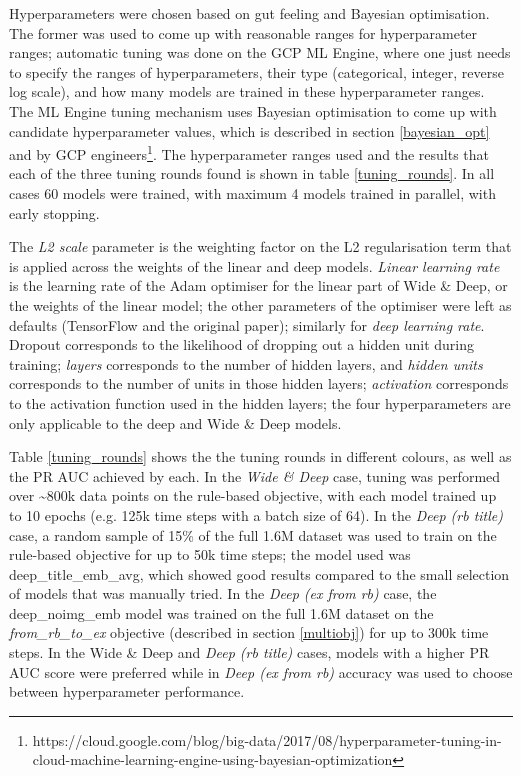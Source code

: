 Hyperparameters were chosen based on gut feeling and Bayesian optimisation.
The former was used to come up with reasonable ranges for hyperparameter ranges; automatic tuning was done on the GCP ML Engine, where one just needs to specify the ranges of hyperparameters, their type (categorical, integer, reverse log scale), and how many models are trained in these hyperparameter ranges.
The ML Engine tuning mechanism uses Bayesian optimisation to come up with candidate hyperparameter values, which is described in section \ref{bayesian_opt} and by GCP engineers\footnote{https://cloud.google.com/blog/big-data/2017/08/hyperparameter-tuning-in-cloud-machine-learning-engine-using-bayesian-optimization}.
The hyperparameter ranges used and the results that each of the three tuning rounds found is shown in table \ref{tuning_rounds}.
In all cases 60 models were trained, with maximum 4 models trained in parallel, with early stopping.

The \textit{L2 scale} parameter is the weighting factor on the L2 regularisation term that is applied across the weights of the linear and deep models.
\textit{Linear learning rate} is the learning rate of the Adam optimiser for the linear part of Wide \& Deep, or the weights of the linear model; the other parameters of the optimiser were left as defaults (TensorFlow and the original paper); similarly for \textit{deep learning rate}.
Dropout corresponds to the likelihood of dropping out a hidden unit during training; \textit{layers} corresponds to the number of hidden layers, and \textit{hidden units} corresponds to the number of units in those hidden layers; \textit{activation} corresponds to the activation function used in the hidden layers; the four hyperparameters are only applicable to the deep and Wide \& Deep models.

Table \ref{tuning_rounds} shows the the tuning rounds in different colours, as well as the PR AUC achieved by each.
In the \textit{Wide \& Deep} case, tuning was performed over \textasciitilde800k data points on the rule-based objective, with each model trained up to 10 epochs (e.g. 125k time steps with a batch size of 64).
In the \textit{Deep (rb title)} case, a random sample of 15\% of the full 1.6M dataset was used to train on the rule-based objective for up to 50k time steps; the model used was deep\_title\_emb\_avg, which showed good results compared to the small selection of models that was manually tried.
In the \textit{Deep (ex from rb)} case, the deep\_noimg\_emb model was trained on the full 1.6M dataset on the \textit{from\_rb\_to\_ex} objective (described in section \ref{multiobj}) for up to 300k time steps.
In the {Wide \& Deep} and \textit{Deep (rb title)} cases, models with a higher PR AUC score were preferred while in \textit{Deep (ex from rb)} accuracy was used to choose between hyperparameter performance.

